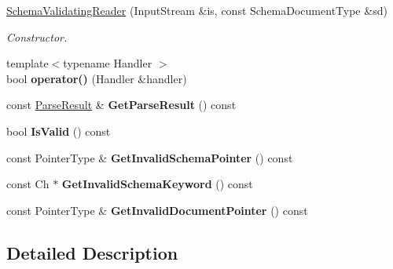 \begin{DoxyCompactItemize}
\item 
\hyperlink{class_schema_validating_reader_ae7945b71687ad3dd13b9c3d096892eac}{Schema\+Validating\+Reader} (Input\+Stream \&is, const Schema\+Document\+Type \&sd)
\begin{DoxyCompactList}\small\item\em Constructor. \end{DoxyCompactList}\item 
{\footnotesize template$<$typename Handler $>$ }\\bool {\bfseries operator()} (Handler \&handler)\hypertarget{class_schema_validating_reader_a7135d8d53aacd850fbce2901cca4a4c3}{}\label{class_schema_validating_reader_a7135d8d53aacd850fbce2901cca4a4c3}

\item 
const \hyperlink{struct_parse_result}{Parse\+Result} \& {\bfseries Get\+Parse\+Result} () const \hypertarget{class_schema_validating_reader_aa5445bcfe27eaa55b28961a0ad6e86c1}{}\label{class_schema_validating_reader_aa5445bcfe27eaa55b28961a0ad6e86c1}

\item 
bool {\bfseries Is\+Valid} () const \hypertarget{class_schema_validating_reader_a01576a2c4ee21a6c73071e5f445dc0bd}{}\label{class_schema_validating_reader_a01576a2c4ee21a6c73071e5f445dc0bd}

\item 
const Pointer\+Type \& {\bfseries Get\+Invalid\+Schema\+Pointer} () const \hypertarget{class_schema_validating_reader_aaf450fe1f71af00a783d197e81ec6786}{}\label{class_schema_validating_reader_aaf450fe1f71af00a783d197e81ec6786}

\item 
const Ch $\ast$ {\bfseries Get\+Invalid\+Schema\+Keyword} () const \hypertarget{class_schema_validating_reader_ac040fa8a06b5950b40f907cc5fbec201}{}\label{class_schema_validating_reader_ac040fa8a06b5950b40f907cc5fbec201}

\item 
const Pointer\+Type \& {\bfseries Get\+Invalid\+Document\+Pointer} () const \hypertarget{class_schema_validating_reader_a8e5fb64a2b4c76572501c3b3e611e0fb}{}\label{class_schema_validating_reader_a8e5fb64a2b4c76572501c3b3e611e0fb}

\end{DoxyCompactItemize}


\subsection{Detailed Description}
